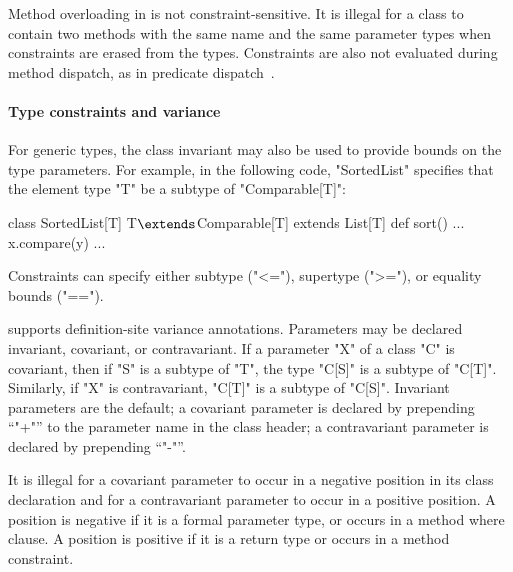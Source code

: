 Method overloading in \Xten is not constraint-sensitive.  It is
illegal for a class to contain two methods with the same name
and the same parameter types when constraints are erased from the 
types.  Constraints are also not evaluated during method
dispatch, as in predicate dispatch~\cite{jpred}.


\paragraph{Type constraints and variance}
\label{sec:variance-overview}

For generic types, the class invariant may also be used to provide 
bounds on the type parameters.
For example, in the following code,
\xcd"SortedList" 
specifies that the element type \xcd"T"
be a subtype of \xcd"Comparable[T]":
\begin{xtenmathnoindent}
 class SortedList[T] {T$\extends$Comparable[T]} extends List[T] {
   def sort() { ... x.compare(y) ... }
 }
\end{xtenmathnoindent}
Constraints can specify either subtype (\xcd"<="), supertype (\xcd">="),
or equality bounds (\xcd"==").

\Xten supports definition-site variance annotations.
Parameters may be declared invariant, covariant, or
contravariant.
If a parameter \xcd"X" of a class \xcd"C" is covariant,
then if \xcd"S" is a subtype of
\xcd"T", the type \xcd"C[S]" is a subtype of \xcd"C[T]".
Similarly, if \xcd"X" is contravariant, 
\xcd"C[T]" is a subtype of \xcd"C[S]".
Invariant parameters are the default; a covariant parameter is
declared by prepending ``\xcd"+"'' to the parameter name in the
class header; a contravariant parameter is declared by
prepending ``\xcd"-"''.

It is illegal for a covariant parameter to occur in a negative
position in its class declaration and for a contravariant
parameter to occur in a positive position.  A position is
negative if it is a formal parameter type, or occurs in a method
where clause.  A position is positive if it is a return type or
occurs in a method constraint.





